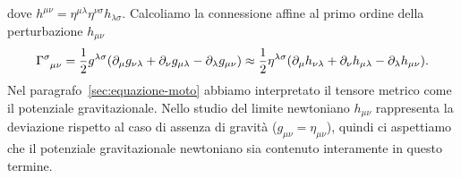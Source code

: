 dove $h^{\mu\nu} = \eta^{\mu\lambda}\eta^{\nu\sigma} h_{\lambda\sigma}$.
Calcoliamo la connessione affine al primo ordine della perturbazione
$h_{\mu\nu}$
\begin{equation}
  \label{eq:christoffel-approx}
  \tensor{\Gamma}{^{\sigma}_{\mu\nu}} = \frac{1}{2}g^{\lambda\sigma}
  (\partial_{\mu}g_{\nu\lambda} + \partial_{\nu}g_{\mu\lambda}
  - \partial_{\lambda}g_{\mu\nu}) \approx \frac{1}{2}\eta^{\lambda\sigma}
  (\partial_{\mu}h_{\nu\lambda} + \partial_{\nu}h_{\mu\lambda}
  - \partial_{\lambda}h_{\mu\nu}).
\end{equation}
Nel paragrafo~\ref{sec:equazione-moto} abbiamo interpretato il tensore metrico
come il potenziale gravitazionale.  Nello studio del limite newtoniano
$h_{\mu\nu}$ rappresenta la deviazione rispetto al caso di assenza di gravità
($g_{\mu\nu} = \eta_{\mu\nu}$), quindi ci aspettiamo che il potenziale
gravitazionale newtoniano sia contenuto interamente in questo termine.

